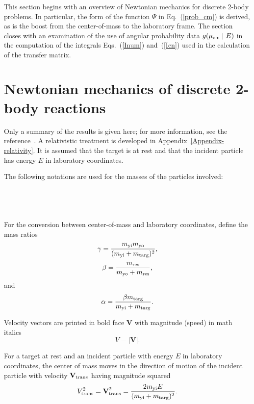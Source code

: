 This section begins with an overview of Newtonian mechanics
for discrete 2-body problems.  In particular, the form of the function
$\Psi$ in Eq.~(\ref{prob_cm}) is derived, as is the boost from the
center-of-mass to the laboratory frame.  The section closes
with an examination of the use of angular probability data 
$g( \mu_{\text{cm}} \mid E)$ in the computation of the integrals
Eqs.~(\ref{Inum}) and~(\ref{Ien}) used in the calculation of the
transfer matrix.  

\section{Newtonian mechanics of discrete 2-body reactions}
Only a summary of the results is given here; for more information,
see the reference~\cite{endep}.  A relativistic treatment is
developed in Appendix~\ref{Appendix-relativity}.  It is assumed that the target is at rest 
and that the incident particle has
energy $E$ in laboratory coordinates.

The following
notations are used for the masses of the particles involved:\\
 \\
 \\
 \\
 \\
For the conversion
between center-of-mass and laboratory coordinates, define
the mass ratios
$$
  \gamma = \frac
    { m_{\text{yi}} m_{\text{yo}} }
    { ( m_{\text{yi}} + m_{\text{targ}} )^2 },
$$
$$
   \beta = \frac
    { m_{\text{res}} }
    { m_{\text{yo}} + m_{\text{res}} },
$$
and
$$
   \alpha = \frac
    {\beta m_{\text{targ}}}
    { m_{\text{yi}} + m_{\text{targ}} }.
$$

Velocity vectors are printed in bold face $\textbf{V}$ with
magnitude (speed) in math italics
$$
  V = | \textbf{V} |.
$$

For a target at rest and an incident particle with
energy $E$ in laboratory coordinates, the center of mass
moves in the direction of motion of
the incident particle with velocity $\textbf{V}_{\text{trans}}$ having magnitude squared 
\begin{equation}
  V_{\text{trans}}^2 = \textbf{V}_{\text{trans}}^2 =
    \frac{ 2m_{\text{yi}}  E}
    { ( m_{\text{yi}} + m_{\text{targ}} )^2 }.
  \label{Vtrans-length}
\end{equation}

